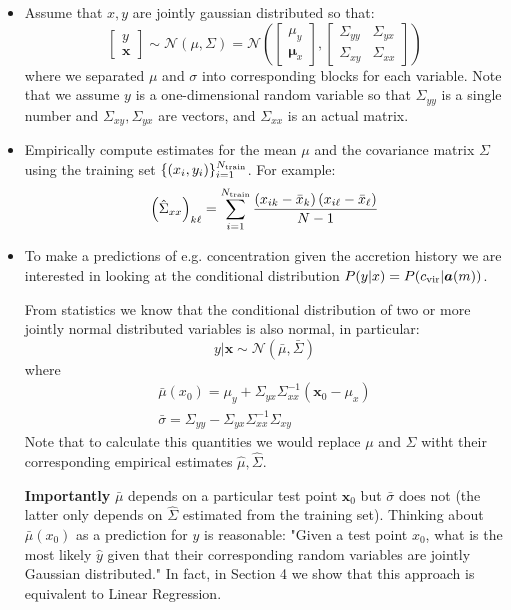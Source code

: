 \documentclass[a4paper]{article}
\newcommand{\pth}[1]{\left(#1\right)}
\newcommand{\cvir}[0]{c_{\rm vir}}
\renewcommand{\vec}[1]{\boldsymbol{#1}}
\newcommand{\xv}[0]{\vec{x}}
\begin{document}
\begin{itemize}
	\item Assume that $x,y$ are jointly gaussian distributed so that: 
	\[
		\begin{bmatrix}
			y \\ 
			\vec{x}
		\end{bmatrix} \sim \mathcal{N}(\mu, \Sigma) = \mathcal{N}\pth{
		\begin{bmatrix}
			\mu_y \\ 
			\vec{\mu}_{x}
		\end{bmatrix}, 	
		\begin{bmatrix}
		   	\Sigma_{yy} & \Sigma_{yx} \\
			\Sigma_{xy} & \Sigma_{xx}
	 	\end{bmatrix}
	 }
	\]
	where we separated $\mu$ and $\sigma$ into corresponding blocks for each variable. Note that we assume $y$ is a one-dimensional random variable so that $\Sigma_{yy}$ is a single number and $\Sigma_{xy}, \Sigma_{yx}$ are vectors, and $\Sigma_{xx}$ is an actual matrix.


	\item Empirically compute estimates for the mean $\mu$ and the covariance matrix $\Sigma$ using the training set $\{\left(x_{i}, y_{i}\right)\}_{i=1}^{N_{\rm train}}$. For example: 
	\[
		\pth{\hat{\Sigma}_{xx}}_{k\ell} = \sum_{i=1}^{N_{\rm train}} \frac{\pth{x_{ik} - \bar{x}_{k}}\pth{x_{i\ell} - \bar{x}_{\ell}}}{N-1}
	\]


	\item To make a predictions of e.g. concentration given the accretion history we are interested in looking at the conditional distribution $P(y | x) = P(\cvir \vert \vec{a}(m))$. 

	From statistics we know that the conditional distribution of two or more jointly normal distributed variables is also normal, in particular: 
	\[
		y \vert \vec{x} \sim \mathcal{N}\pth{\bar{\mu}, \bar{\Sigma}}
	\]
	where 
	\begin{align}
		\bar{\mu} \pth{x_{0}} = \mu_{y} + \Sigma_{yx} \Sigma_{xx}^{-1} \pth{\xv_{0} - \mu_{x}} \label{eq:mu_bar} \\
		\bar{\sigma} = \Sigma_{yy} - \Sigma_{yx} \Sigma_{xx}^{-1} \Sigma_{xy}
	\end{align}
	Note that to calculate this quantities we would replace $\mu$ and $\Sigma$ witht their corresponding empirical estimates $\hat{\mu}, \hat{\Sigma}$. 

	\textbf{Importantly} $\bar{\mu}$ depends on a particular test point $\xv_{0}$ but $\bar{\sigma}$ does not (the latter only depends on $\hat{\Sigma}$ estimated from the training set). Thinking about $\bar{\mu}(x_{0})$ as a prediction for $y$ is reasonable: "Given a test point $x_{0}$, what is the most likely $\hat{y}$ given that their corresponding random variables are jointly Gaussian distributed." In fact, in Section 4 we show that this approach is equivalent to Linear Regression.
\end{itemize}
\end{document}
